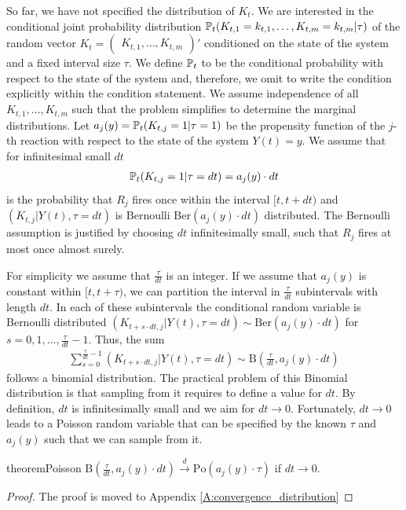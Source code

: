 So far, we have not specified the distribution of $K_t$. We are interested in the conditional joint probability distribution $\mathbb{P}_t(K_{t,1} = k_{t,1}, \dots, K_{t,m} = k_{t,m}|\tau)$ of the random vector $K_t = \begin{pmatrix}
K_{t,1}, \dots, K_{t,m} \end{pmatrix}'$ conditioned on the state of the system and a fixed interval size $\tau$. We define $\mathbb{P}_t$ to be the conditional probability with respect to the state of the system and, therefore, we omit to write the condition explicitly within the condition statement. We assume independence of all $K_{t, 1},\hdots, K_{t, m}$ such that the problem simplifies to determine the marginal distributions. Let $a_j(y) = \mathbb{P}_t(K_{t,j}=1|\tau=1)$ be the propensity function of the $j$-th reaction with respect to the state of the system $Y(t)=y$. We assume that for infinitesimal small $dt$
\begin{align}
\mathbb{P}_t(K_{t,j} = 1|\tau = dt) = a_j(y) \cdot dt
\end{align}
is the probability that $R_j$ fires once within the interval $[t, t+dt)$ and $\left(K_{t,j}|Y(t), \tau =dt \right)$ is Bernoulli $\mathrm{Ber}(a_j(y) \cdot dt)$ distributed. The Bernoulli assumption is justified by choosing $dt$ infinitesimally small, such that $R_j$ fires at most once almost surely.

For simplicity we assume that $\frac{\tau}{dt}$ is an integer. If we assume that $a_j(y)$ is constant within $[t, t+\tau)$, we can partition the interval in $\frac{\tau}{dt}$ subintervals with length $dt$. In each of these subintervals the conditional random variable is Bernoulli distributed $\left(K_{t+s \cdot dt,j}|Y(t), \tau =dt\right) \sim \mathrm{Ber}(a_j(y) \cdot dt)$ for $s=0, 1, \dots, \frac{\tau}{dt} - 1$. Thus, the sum
\begin{align}
\sum_{s=0}^{\frac{\tau}{dt}-1} \left(K_{t+s \cdot dt, j} | Y(t), \tau = dt\right) \sim \textrm{B}\left(\frac{\tau}{dt}, a_j(y) \cdot dt\right)
\end{align}
follows a binomial distribution. The practical problem of this Binomial distribution is that sampling from it requires to define a value for $dt$. By definition, $dt$ is infinitesimally small and we aim for $dt \to 0$. Fortunately, $dt \to 0$ leads to a Poisson random variable that can be specified by the known $\tau$ and $a_j(y)$ such that we can sample from it.
\begin{restatable}{theorem}{Poisson}
$\textrm{B}\left(\frac{\tau}{dt}, a_j(y) \cdot dt\right) \xrightarrow{d} \textrm{Po}(a_j(y) \cdot \tau)$ if $dt \to 0$.
\end{restatable}
\begin{proof}
The proof is moved to Appendix \ref{A:convergence_distribution}
\end{proof}

